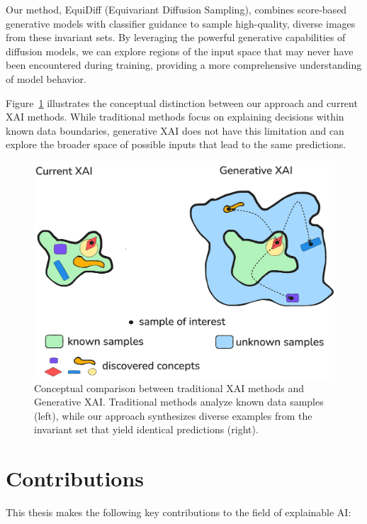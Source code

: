 \documentclass[licencjacka,en]{pracamgr}
\newcommand{\method}[1]{EquiDiff}  %
\begin{document}
Our method, \method{} (Equivariant Diffusion Sampling), combines score-based generative models with classifier guidance to sample high-quality, diverse images from these invariant sets. By leveraging the powerful generative capabilities of diffusion models, we can explore regions of the input space that may never have been encountered during training, providing a more comprehensive understanding of model behavior.

Figure~\ref{fig:1_teaser} illustrates the conceptual distinction between our approach and current XAI methods. While traditional methods focus on explaining decisions within known data boundaries, generative XAI does not have this limitation and can explore the broader space of possible inputs that lead to the same predictions.

\begin{figure}[h]
\centering
\includegraphics[width=0.8\linewidth]{figures/main/teaser1.png}
\caption{Conceptual comparison between traditional XAI methods and Generative XAI. Traditional methods analyze known data samples (left), while our approach synthesizes diverse examples from the invariant set that yield identical predictions (right).}
\label{fig:1_teaser}
\end{figure}

\section{Contributions}

This thesis makes the following key contributions to the field of explainable AI:
\end{document}
